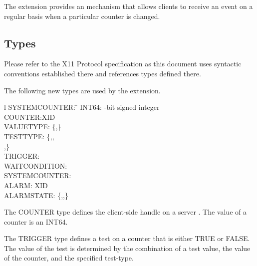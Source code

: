 The extension provides an  mechanism that allows clients to
receive an event on a regular basis when a particular counter is changed.

\subsection{Types}

Please refer to the X11 Protocol specification as this document uses
syntactic conventions established there and references types defined there.

The following new types are used by the extension.

\begin{tabbing}{l}
SYSTEMCOUNTER: \=\kill
	INT64:	-bit signed integer\\
	COUNTER:\>XID\\
  	VALUETYPE:\>  \{,\}\\
 	TESTTYPE:\> \{,,\\
		\>,\}\\
	TRIGGER:\\
	WAITCONDITION:\\
	SYSTEMCOUNTER:\\
	ALARM:	\>XID\\
	ALARMSTATE:\> \{,,\}\\
\end{tabbing}

The COUNTER type defines the client-side handle on a server .
The value of a counter is an INT64.

The TRIGGER type defines a test on a counter that is either TRUE or FALSE.
The value of the test is determined by the combination of a test value, the
value of the counter, and the specified test-type.

